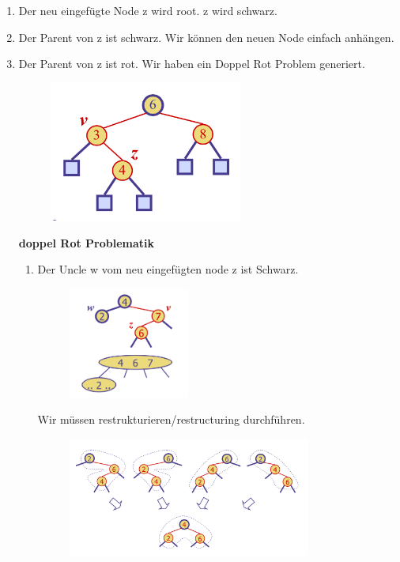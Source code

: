 \documentclass[a4paper,10pt]{report}
\begin{document}
\begin{enumerate}
	\item
		Der neu eingefügte Node z wird root. z wird schwarz.
	\item
		Der Parent von z ist schwarz. Wir können den neuen Node einfach anhängen.
	\item
		Der Parent von z ist rot.  Wir haben ein Doppel Rot Problem generiert.
		\begin{figure}[H]
			\begin{center}
  				\includegraphics[width=0.6\textwidth]{img/doubleRedIssue.png}
			\end{center}
		\end{figure}
		\newpage
		\textbf{doppel Rot Problematik}\\
		\begin{enumerate}
			\item
			Der Uncle w vom neu eingefügten node z ist Schwarz.\\
			\begin{figure}[H]
				\begin{center}
  					\includegraphics[width=0.4\textwidth]{img/redBlackCase1.png}
				\end{center}
			\end{figure}
			Wir müssen restrukturieren/restructuring durchführen.\\
			\begin{figure}[H]
				\begin{center}
  					\includegraphics[width=0.8\textwidth]{img/redblackrestructuring.png}

\end{center}
\end{figure}
\end{enumerate}
\end{enumerate}
\end{document}
